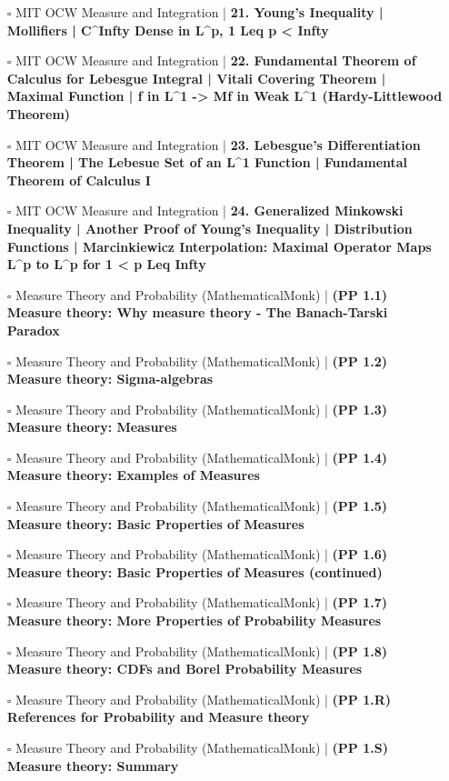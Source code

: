 \documentclass[a4, landscape, 12pt]{article}
\newcommand{\checkbox}{$\square$}%
\begin{document}
\begin{itemize}
{}
\item [\checkbox] MIT OCW Measure and Integration  | \textbf{21. Young's Inequality | Mollifiers | C^{Infty} Dense in L^p, 1 Leq p < Infty
}
\item [\checkbox] MIT OCW Measure and Integration  | \textbf{22. Fundamental Theorem of Calculus for Lebesgue Integral | Vitali Covering Theorem | Maximal Function | f in L^1 -> Mf in Weak L^1 (Hardy-Littlewood Theorem)
}
\item [\checkbox] MIT OCW Measure and Integration  | \textbf{23. Lebesgue's Differentiation Theorem | The Lebesue Set of an L^1 Function | Fundamental Theorem of Calculus I
}
\item [\checkbox] MIT OCW Measure and Integration  | \textbf{24. Generalized Minkowski Inequality | Another Proof of Young's Inequality | Distribution Functions | Marcinkiewicz Interpolation: Maximal Operator Maps L^p to L^p for 1 < p Leq Infty
}
\item [\checkbox] Measure Theory and Probability (MathematicalMonk)  | \textbf{(PP 1.1) Measure theory: Why measure theory - The Banach-Tarski Paradox
}
\item [\checkbox] Measure Theory and Probability (MathematicalMonk)  | \textbf{(PP 1.2) Measure theory: Sigma-algebras
}
\item [\checkbox] Measure Theory and Probability (MathematicalMonk)  | \textbf{(PP 1.3) Measure theory: Measures
}
\item [\checkbox] Measure Theory and Probability (MathematicalMonk)  | \textbf{(PP 1.4) Measure theory: Examples of Measures
}
\item [\checkbox] Measure Theory and Probability (MathematicalMonk)  | \textbf{(PP 1.5) Measure theory: Basic Properties of Measures
}
\item [\checkbox] Measure Theory and Probability (MathematicalMonk)  | \textbf{(PP 1.6) Measure theory: Basic Properties of Measures (continued)
}
\item [\checkbox] Measure Theory and Probability (MathematicalMonk)  | \textbf{(PP 1.7) Measure theory: More Properties of Probability Measures
}
\item [\checkbox] Measure Theory and Probability (MathematicalMonk)  | \textbf{(PP 1.8) Measure theory: CDFs and Borel Probability Measures
}
\item [\checkbox] Measure Theory and Probability (MathematicalMonk)  | \textbf{(PP 1.R) References for Probability and Measure theory
}
\item [\checkbox] Measure Theory and Probability (MathematicalMonk)  | \textbf{(PP 1.S) Measure theory: Summary
}
\end{itemize}
\end{document}
